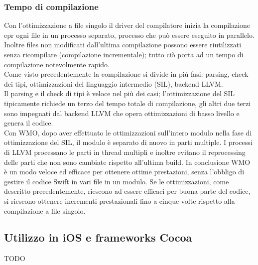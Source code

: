 \subsubsection{Tempo di compilazione}
Con l'ottimizzazione a file singolo il driver del compilatore inizia la compilazione epr ogni file in un processo separato, processo che può essere eseguito in parallelo. Inoltre files non modificati dall'ultima compilazione possono essere riutilizzati senza ricompilare (compilazione incrementale); tutto ciò porta ad un tempo di compilazione notevolmente rapido.\\
Come visto precedentemente la compilazione si divide in più fasi: parsing, check dei tipi, ottimizzazioni del linguaggio intermedio (SIL), backend LLVM.\\
Il parsing e il check di tipi è veloce nel più dei casi; l'ottimizzazione del SIL tipicamente richiede un terzo del tempo totale di compilazione, gli altri due terzi sono impegnati dal backend LLVM che opera ottimizzazioni di basso livello e genera il codice.\\
Con WMO, dopo aver effettuato le ottimizzazioni sull'intero modulo nella fase di ottimizzazione del SIL, il modulo è separato di nuovo in parti multiple. I processi di LLVM processano le parti in thread multipli e inoltre evitano il reprocessing delle parti che non sono cambiate rispetto all'ultima build.
In conclusione WMO è un modo veloce ed efficace per ottenere ottime prestazioni, senza l'obbligo di gestire il codice Swift in vari file in un modulo. Se le ottimizzazioni, come descritto precedentemente, riescono ad essere efficaci per buona parte del codice, si riescono ottenere incrementi prestazionali fino a cinque volte rispetto alla compilazione a file singolo. 
\subsection{Utilizzo in iOS e frameworks Cocoa}
TODO
